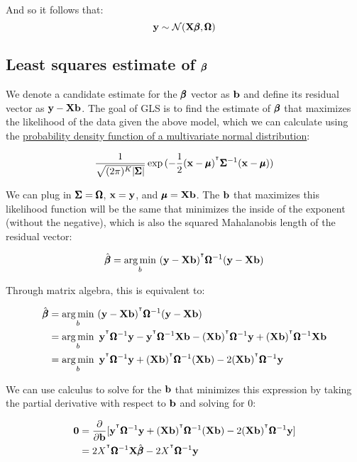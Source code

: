 \documentclass[12pt]{article}
\begin{document}
And so it follows that:
$$ \mathbf{y} \sim \mathcal{N} (\mathbf{X} \pmb{\beta}, \pmb{\Omega}) $$





\subsection[Least squares estimate of beta]{Least squares estimate of $\pmb{\beta}$}

We denote a candidate estimate for the $\pmb{\beta}$ vector as $\mathbf{b}$ and define its residual vector as $ \mathbf{y} - \mathbf{X} \mathbf{b} $. The goal of GLS is to find the estimate of $\pmb{\beta}$ that maximizes the likelihood of the data given the above model, which we can calculate using the \href{https://en.wikipedia.org/wiki/Multivariate_normal_distribution}{probability density function of a multivariate normal distribution}:

$$
\frac{1}{\sqrt{(2 \pi)^K |\pmb{\Sigma}| }}
\exp{(-\frac{1}{2}(\mathbf{x}- \pmb{\mu})^{^\intercal} \pmb{\Sigma}^{-1} (\mathbf{x}- \pmb{\mu}))}
$$

We can plug in $\pmb{\Sigma} = \pmb{\Omega}$, $\mathbf{x} = \mathbf{y}$, and $\pmb{\mu} = \mathbf{X} \mathbf{b}$. The $\mathbf{b}$ that maximizes this likelihood function will be the same that minimizes the inside of the exponent (without the negative), which is also the squared Mahalanobis length of the residual vector:

$$ \hat{\pmb{\beta}} = \operatorname*{arg\,min}_b ~ (\mathbf{y} - \mathbf{X} \mathbf{b})^{^\intercal} \pmb{\Omega}^{-1} (\mathbf{y} - \mathbf{X} \mathbf{b}) $$

Through matrix algebra, this is equivalent to:

\begin{align*}
    \hat{\pmb{\beta}} &= \operatorname*{arg\,min}_b ~ (\mathbf{y} - \mathbf{X} \mathbf{b})^{^\intercal} \pmb{\Omega}^{-1} (\mathbf{y} - \mathbf{X} \mathbf{b}) \\
    &= \operatorname*{arg\,min}_b ~ \mathbf{y}^{^\intercal} \pmb{\Omega}^{-1} \mathbf{y} - \mathbf{y}^{^\intercal} \pmb{\Omega}^{-1} \mathbf{X} \mathbf{b} - (\mathbf{X} \mathbf{b})^{^\intercal} \pmb{\Omega}^{-1} \mathbf{y} + (\mathbf{X} \mathbf{b})^{^\intercal} \pmb{\Omega}^{-1} \mathbf{X} \mathbf{b} \\
    &= \operatorname*{arg\,min}_b ~ \mathbf{y}^{^\intercal} \pmb{\Omega}^{-1} \mathbf{y} + (\mathbf{X} \mathbf{b})^{^\intercal} \pmb{\Omega}^{-1} (\mathbf{X} \mathbf{b}) - 2(\mathbf{X} \mathbf{b})^{^\intercal} \pmb{\Omega}^{-1} \mathbf{y}
\end{align*}

We can use calculus to solve for the $\mathbf{b}$ that minimizes this expression by taking the partial derivative with respect to $\mathbf{b}$ and solving for 0:

\begin{align*}
    \mathbf{0} &= \frac{\partial}{\partial \mathbf{b}} [ \mathbf{y}^{^\intercal} \pmb{\Omega}^{-1} \mathbf{y} + (\mathbf{X} \mathbf{b})^{^\intercal} \pmb{\Omega}^{-1} (\mathbf{X} \mathbf{b}) - 2(\mathbf{X} \mathbf{b})^{^\intercal} \pmb{\Omega}^{-1} \mathbf{y} ]\\
    &=  2X^{^\intercal} \pmb{\Omega}^{-1} \mathbf{X} \hat{\pmb{\beta}} - 2X^{^\intercal} \pmb{\Omega}^{-1} \mathbf{y}
\end{align*}
\end{document}
